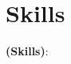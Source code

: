 \documentclass[11pt]{article}
\newcommand{\spaces}{1em}
\begin{document}
          \section*{Skills}

          \vspace{\spaces}

          \textbf{(Skills)}:
          
          \vspace{\spaces}
          


			                          
\end{document}
